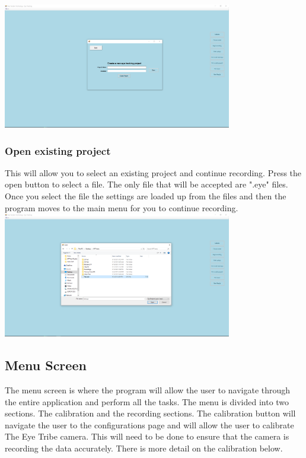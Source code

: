 		\includegraphics[scale=0.2, width=10cm, keepaspectratio]{./Images/NewProject.PNG}

\subsubsection{Open existing project} 
This will allow you to select an existing project and continue recording. Press the open button to select a file. The only file that will be accepted are ".eye" files. Once you select the file the settings are loaded up from the files and then the program moves to the main menu for you to continue recording.\\
		\includegraphics[scale=0.2, width=10cm, keepaspectratio]{./Images/OpenProject.PNG}\\
\iffalse
\subsection{Menu Screen}
The menu screen is where the program will allow the user to navigate through the entire application and perform all the tasks. The menu is divided into two sections. The calibration and the recording sections. The calibration button will navigate the user to the configurations page and will allow the user to calibrate The Eye Tribe camera. This will need to be done to ensure that the camera is recording the data accurately. There is more detail on the calibration below.

